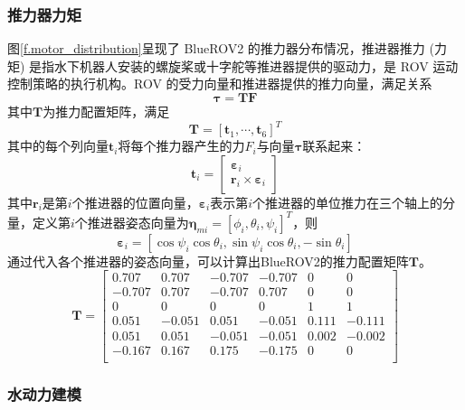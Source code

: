 \subsubsection{推力器力矩}

图\ref{f.motor_distribution}呈现了 BlueROV2 的推力器分布情况，推进器推力 (力矩) 是指水下机器人安装的螺旋桨或十字舵等推进器提供的驱动力，是 ROV 运动控制策略的执行机构。ROV 的受力向量和推进器提供的推力向量，满足关系
\begin{equation}
     \symbf{\tau} = \symbf{T}\symbf{F}
\end{equation}
其中$\symbf{T}$为推力配置矩阵，满足
\begin{equation}
    \symbf{T} = [\symbf{t}_1, \cdots, \symbf{t}_6]^T
\end{equation}
其中的每个列向量$\symbf{t}_i$将每个推力器产生的力$F_i$与向量$\symbf{\tau}$联系起来：
\begin{equation}
\symbf{t}_i = \begin{bmatrix}
    \symbf{\varepsilon}_i \\
    \symbf{r}_i \times \symbf{\varepsilon}_i
\end{bmatrix}
\end{equation}
其中$\symbf{r}_i$是第$i$个推进器的位置向量，$\symbf{\varepsilon}_i$表示第$i$个推进器的单位推力在三个轴上的分量，定义第$i$个推进器姿态向量为$\symbf{\eta}_{mi}=[\phi_i, \theta_i, \psi_i]^T$，则
\begin{equation}
    \symbf{\varepsilon}_i=[\cos\psi_i\cos\theta_i,\sin\psi_i\cos\theta_i,-\sin\theta_i]
\end{equation}
通过代入各个推进器的姿态向量，可以计算出BlueROV2的推力配置矩阵$\symbf{T}$。
\begin{equation}
    \symbf{T} = \begin{bmatrix}
        0.707 & 0.707 & -0.707 & -0.707 & 0 & 0\\
        -0.707 & 0.707 & -0.707 & 0.707 & 0 & 0 \\
         0 & 0 & 0 & 0 & 1 & 1 \\
         0.051 & -0.051 & 0.051 & -0.051 & 0.111 & -0.111 \\
         0.051 & 0.051 & -0.051 & -0.051 & 0.002 & -0.002 \\
         -0.167 & 0.167 & 0.175 & -0.175 & 0 & 0 \\
    \end{bmatrix}
\end{equation}

\subsubsection{水动力建模}

